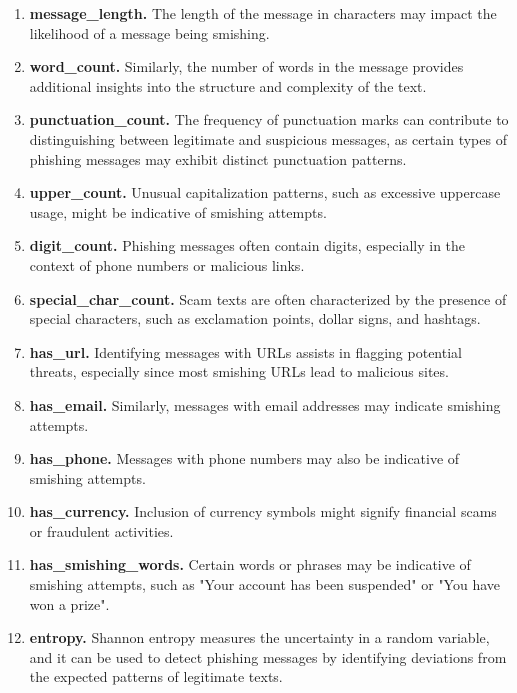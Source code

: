 \documentclass[conference]{IEEEtran}
\begin{document}
\begin{enumerate}
    \item \textbf{message\_length.} The length of the message in characters may impact the likelihood of a message being smishing.
    \item \textbf{word\_count.} Similarly, the number of words in the message provides additional insights into the structure and complexity of the text.
    \item \textbf{punctuation\_count.} The frequency of punctuation marks can contribute to distinguishing between legitimate and suspicious messages, as certain types of phishing messages may exhibit distinct punctuation patterns.
    \item \textbf{upper\_count.} Unusual capitalization patterns, such as excessive uppercase usage, might be indicative of smishing attempts.
    \item \textbf{digit\_count.} Phishing messages often contain digits, especially in the context of phone numbers or malicious links.
    \item \textbf{special\_char\_count.} Scam texts are often characterized by the presence of special characters, such as exclamation points, dollar signs, and hashtags.
    \item \textbf{has\_url.} Identifying messages with URLs assists in flagging potential threats, especially since most smishing URLs lead to malicious sites.
    \item \textbf{has\_email.} Similarly, messages with email addresses may indicate smishing attempts.
    \item \textbf{has\_phone.} Messages with phone numbers may also be indicative of smishing attempts.
    \item \textbf{has\_currency.} Inclusion of currency symbols might signify financial scams or fraudulent activities.
    \item \textbf{has\_smishing\_words.} Certain words or phrases may be indicative of smishing attempts, such as "Your account has been suspended" or "You have won a prize".
    \item \textbf{entropy.} Shannon entropy measures the uncertainty in a random variable, and it can be used to detect phishing messages by identifying deviations from the expected patterns of legitimate texts.
\end{enumerate}
\end{document}
